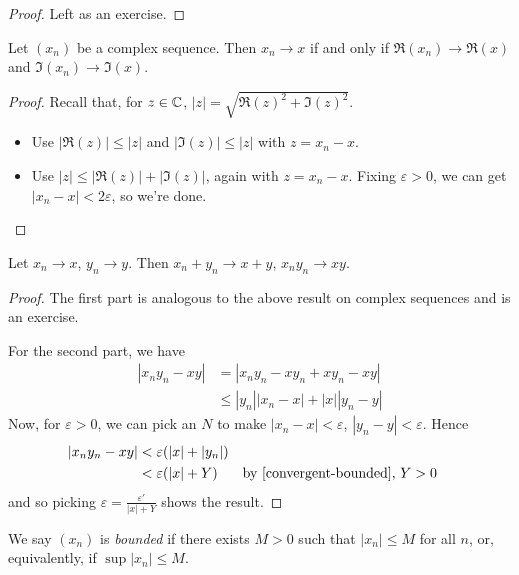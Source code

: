 \documentclass{../template/note}
\begin{document}
    \begin{proof}
        Left as an exercise.
    \end{proof}
    
    \begin{lemma}
        Let \((x_n)\) be a complex sequence. Then \(x_n \to x\) if and only if \(\Re(x_n) \to \Re(x)\) and \(\Im(x_n) \to \Im(x)\).
    \end{lemma}
    
    \begin{proof}
        Recall that, for \(z \in \mathbb C\), \(|z| = \sqrt{\Re(z)^2 + \Im(z)^2}\).
        \begin{itemize}
            \item[\(\implies\)] Use \(|\Re(z)| \leq |z|\) and \(|\Im(z)| \leq |z|\) with \(z = x_n - x\).
            \item[\(\impliedby\)] Use \(|z| \leq |\Re(z)| + |\Im(z)|\), again with \(z = x_n - x\). Fixing \(\varepsilon > 0\), we can get \(|x_n - x| < 2\varepsilon\), so we're done.
        \end{itemize}
    \end{proof}
    
    \begin{lemma}
        Let \(x_n \to x\), \(y_n \to y\). Then \(x_n + y_n \to x + y\), \(x_ny_n \to xy\).
    \end{lemma}
    
    \begin{proof}
        The first part is analogous to the above result on complex sequences and is an exercise.

        For the second part, we have
        \begin{align*}
            |x_ny_n - xy| &= |x_ny_n - xy_n + xy_n - xy| \\
            &\leq |y_n||x_n-x| + |x||y_n-y|
        \end{align*}
        Now, for \(\varepsilon > 0\), we can pick an \(N\) to make \(|x_n - x| < \varepsilon\), \(|y_n - y| < \varepsilon\). Hence
        \begin{align*}
            |x_ny_n - xy| &< \varepsilon(|x| + |y_n|) \\
            &< \varepsilon(|x| + Y) && \text{by \cref{convergent-bounded}, } Y>0
        \end{align*}
        and so picking \(\varepsilon = \frac{\varepsilon'}{|x| + Y}\) shows the result.
    \end{proof}
    
    \begin{definition}
        We say \((x_n)\) is \emph{bounded} if there exists \(M > 0\) such that \(|x_n| \leq M\) for all \(n\), or, equivalently, if \(\sup |x_n| \leq M\).
    \end{definition}
    
\end{document}
